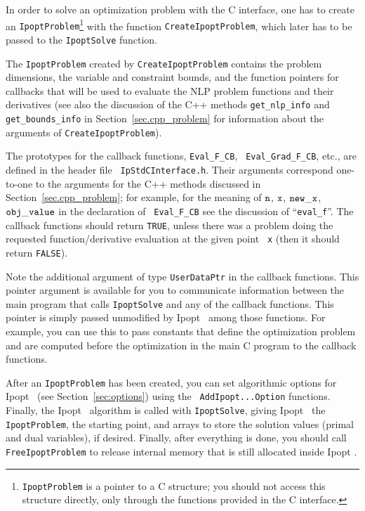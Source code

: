 \documentclass[10pt]{article}
\newcommand{\Ipopt}{{\sc Ipopt }}
\begin{document}
In order to solve an optimization problem with the C interface, one
has to create an {\tt IpoptProblem}\footnote{{\tt IpoptProblem} is a
  pointer to a C structure; you should not access this structure
  directly, only through the functions provided in the C interface.}
with the function {\tt CreateIpoptProblem}, which later has to be
passed to the {\tt IpoptSolve} function.

The {\tt IpoptProblem} created by {\tt CreateIpoptProblem} contains
the problem dimensions, the variable and constraint bounds, and the
function pointers for callbacks that will be used to evaluate the NLP
problem functions and their derivatives (see also the discussion of
the C++ methods {\tt get\_nlp\_info} and {\tt get\_bounds\_info} in
Section~\ref{sec.cpp_problem} for information about the arguments of
{\tt CreateIpoptProblem}).

The prototypes for the callback functions, {\tt Eval\_F\_CB}, {\tt
  Eval\_Grad\_F\_CB}, etc., are defined in the header file {\tt
  IpStdCInterface.h}.  Their arguments correspond one-to-one to the
arguments for the C++ methods discussed in
Section~\ref{sec.cpp_problem}; for example, for the meaning of $\tt
n$, $\tt x$, $\tt new\_x$, $\tt obj\_value$ in the declaration of {\tt
  Eval\_F\_CB} see the discussion of ``{\tt eval\_f}''.  The callback
functions should return {\tt TRUE}, unless there was a problem doing
the requested function/derivative evaluation at the given point {\tt
  x} (then it should return {\tt FALSE}).

Note the additional argument of type {\tt UserDataPtr} in the callback
functions.  This pointer argument is available for you to communicate
information between the main program that calls {\tt IpoptSolve} and
any of the callback functions.  This pointer is simply passed
unmodified by \Ipopt\ among those functions.  For example, you can
use this to pass constants that define the optimization problem and
are computed before the optimization in the main C program to the
callback functions.

After an {\tt IpoptProblem} has been created, you can set algorithmic
options for \Ipopt\ (see Section~\ref{sec:options}) using the {\tt
  AddIpopt...Option} functions.  Finally, the \Ipopt\ algorithm is
called with {\tt IpoptSolve}, giving \Ipopt\ the {\tt IpoptProblem},
the starting point, and arrays to store the solution values (primal
and dual variables), if desired.  Finally, after everything is done,
you should call {\tt FreeIpoptProblem} to release internal memory that
is still allocated inside \Ipopt.
\end{document}
